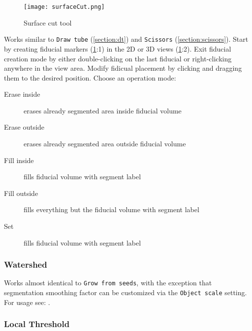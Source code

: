 \begin{figure}[h!]
	\centerline{
		\texttt{[image: surfaceCut.png]}}
	\caption{Surface cut tool}\label{fig:sc}
\end{figure}
\noindent
Works similar to \texttt{Draw tube} (\cref{section:dt}) and \texttt{Scissors} (\cref{section:scissors}).
Start by creating fiducial markers (\cref{fig:sc}:1) in the 2D or 3D views (\cref{fig:sc}:2).
Exit fiducial creation mode by either double-clicking on the last fiducial or right-clicking anywhere in the view area.
Modify fidicual placement by clicking and dragging them to the desired position.
Choose an operation mode:
\begin{description}
	\item [Erase inside] erases already segmented area inside fiducial volume
	\item [Erase outside] erases already segmented area outside fiducial volume
	\item [Fill inside] fills fiducial volume with segment label
	\item [Fill outside] fills everything but the fiducial volume with segment label
	\item [Set] fills fiducial volume with segment label
\end{description}

\pagebreak
\subsubsection{Watershed}
\begin{figure}[h]
	\begin{subfigure}{0.2\textwidth}
		
	\end{subfigure}
	\begin{subfigure}{0.2\textwidth}
		
	\end{subfigure}
\end{figure}

Works almost identical to \texttt{Grow from seeds}, with the exception that segmentation smoothing factor can be customized via the \texttt{Object scale} setting.
For usage see: .

\subsubsection{Local Threshold}
\begin{figure}[h]
	\begin{subfigure}{0.2\textwidth}
		
	\end{subfigure}
	\begin{subfigure}{0.2\textwidth}
		
	\end{subfigure}
\end{figure}

